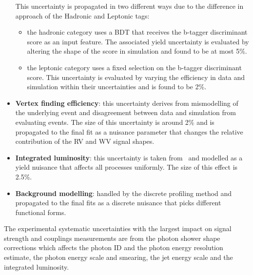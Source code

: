 \begin{itemize}[noitemsep]
{           This uncertainty is propagated in two different ways due to the difference in approach of the \ttH Hadronic and \ttH Leptonic tags:
           \begin{itemize}[noitemsep]
               \item[\textbullet] the hadronic category uses a BDT that receives the b-tagger discriminant score as an input feature. The associated yield uncertainty is evaluated by altering the shape of the score in simulation and found to be at most 5\%.
               \item[\textbullet] the leptonic category uses a fixed selection on the b-tagger discriminant score. This uncertainty is evaluated by varying the efficiency in data and simulation within their uncertainties and is found to be 2\%.  
           \end{itemize}
           }
    \item {\textbf{Vertex finding efficiency}: 
           this uncertainty derives from mismodelling of the underlying event and disagreement between data and simulation from evaluating \Zmumu events. The size of this uncertainty is around 2\% and is propagated to the final fit as a nuisance parameter that changes the relative contribution of the RV and WV signal shapes.
           }
    \item {\textbf{Integrated luminosity}: 
        this uncertainty is taken from~\cite{LumiUncert} and modelled as a yield nuisance that affects all processes uniformly. The size of this effect is 2.5\%.
           }
    \item {\textbf{Background modelling}: 
           handled by the discrete profiling method and propagated to the final fits as a discrete nuisance that picks different functional forms. 
           }
\end{itemize}

The experimental systematic uncertainties with the largest impact on signal strength and couplings measurements are from the photon shower shape corrections which affects the photon ID and the photon energy resolution estimate, the photon energy scale and smearing, the jet energy scale and the integrated luminosity.









